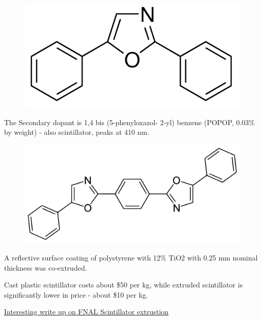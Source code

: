                 
            \begin{figure}[H]
    			\centering
    			\includegraphics[width=12cm]{Chapters/Ch2-Experiment/clas-12-system/pics/fd/2-5-diphenyloxazole.png}
			\end{figure}
                
                The Secondary dopant is 1,4 bis (5-phenyloxazol- 2-yl) benzene (POPOP, 0.03\% by weight) - also scintillator, peaks at 410 nm. 
                
                                
            \begin{figure}[H]
    			\centering
    			\includegraphics[width=12cm]{Chapters/Ch2-Experiment/clas-12-system/pics/fd/popop.png}
			\end{figure}
                
                
                
                A reflective surface coating of polystyrene with 12\% TiO2 with 0.25 mm nominal thickness was co-extruded. 
                
                Cast plastic scintillator costs about \$50 per kg, while extruded scintillator is significantly lower in price - about \$10 per kg. 
                
                \href{https://lss.fnal.gov/archive/2005/pub/fermilab-pub-05-344.pdf}{Interesting write up on FNAL Scintillator extrustion}


